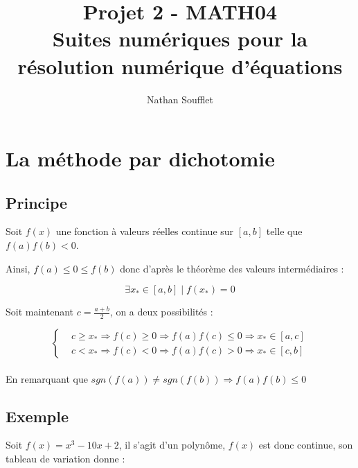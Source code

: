 \documentclass{article}
\begin{document}
\title{Projet 2 - MATH04 \\ Suites numériques pour la résolution numérique d'équations}
\author{Nathan Soufflet}

\maketitle
{}
\newpage

\section{La méthode par dichotomie}

\subsection{Principe}

Soit $f(x)$ une fonction à valeurs réelles continue sur $[a, b]$ telle que $f(a)f(b) < 0$.

Ainsi, $f(a) \leq 0 \leq f(b)$ donc d'après le théorème des valeurs intermédiaires :

$$\exists x_* \in [a, b] \mid f(x_*) = 0$$

Soit maintenant $c = \frac{a + b}{2}$, on a deux possibilités : 

\begin{equation*}
    \left \{
    \begin{aligned}
      & c \geq x_* \Rightarrow f(c) \geq 0 \Rightarrow f(a)f(c) \leq 0 \Rightarrow x_* \in [a, c] \\
      & c < x_* \Rightarrow f(c) < 0 \Rightarrow f(a)f(c) > 0 \Rightarrow x_* \in [c, b]
    \end{aligned} \right.
\end{equation*} \\

En remarquant que $sgn(f(a)) \neq sgn(f(b)) \Rightarrow f(a)f(b) \leq 0$

\subsection{Exemple}

Soit $f(x) = x^{3} - 10x + 2$, il s'agit d'un polynôme, $f(x)$ est donc continue,
son tableau de variation donne :

\begin{center}
\end{center} 
\end{document}
